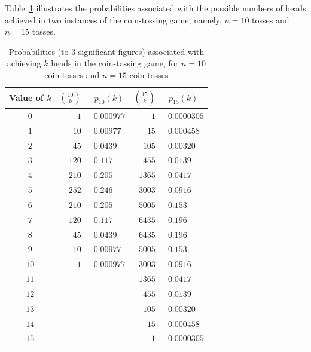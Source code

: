 Table~\ref{tab:select-replace} illustrates the probabilities associated with the possible numbers of {\sc head}s achieved in two instances of the coin-tossing game, namely, $n = 10$ tosses and $n= 15$ tosses.  
\begin{table}[htb]
\caption{Probabilities (to $3$ significant figures) associated with achieving $k$ {\sc head}s in the coin-tossing game, for $n = 10$ coin tosses and $n= 15$ coin tosses}
\begin{center}
\label{tab:select-replace}
\begin{tabular}{|c||r|l||r|l|}
\hline
Value of $k$ & $\displaystyle {10 \choose k}$ & \ $p_{10}(k)$ 
& $\displaystyle {15 \choose k}$ & \ $p_{15}(k)$ \\
\hline
\hline
$0$   &   $  1$ & \ $0.000977$ &     $   1$ &  \ $0.0000305$ \\
$1$   &   $10$ & \   $0.00977$ &      $15$ &  \   $0.000458$ \\
$2$   &   $45$ & \     $0.0439$ &    $105$ &  \     $0.00320$ \\
$3$   & $120$ & \       $0.117$ &    $455$ &  \       $0.0139$ \\
$4$   & $210$ & \      $0.205$ &   $1365$ &  \       $0.0417$ \\
$5$   & $252$ & \      $0.246$ &   $3003$ &  \       $0.0916$ \\
$6$   & $210$ & \      $0.205$ &   $5005$ &  \         $0.153$ \\
$7$   & $120$ & \      $0.117$ &   $6435$ &  \         $0.196$ \\
$8$   &   $45$ & \    $0.0439$ &   $6435$ &  \         $0.196$ \\
$9$   &   $10$ & \  $0.00977$ &   $5005$ & \          $0.153$ \\
$10$ &     $1$ & \ $0.000977$ &  $3003$ & \        $0.0916$ \\
$11$ & --        & \ --                  &   $1365$ & \        $0.0417$ \\
$12$ & --        & \ --                 &      $455$ & \        $0.0139$ \\
$13$ & --       & \ --                  &      $105$ & \      $0.00320$ \\
$14$ & --       & \ --                  &        $15$ & \    $0.000458$ \\
$15$ & --       & \ --                  &          $1$ & \  $0.0000305$  \\
\hline
\end{tabular}
\end{center}
\end{table}
